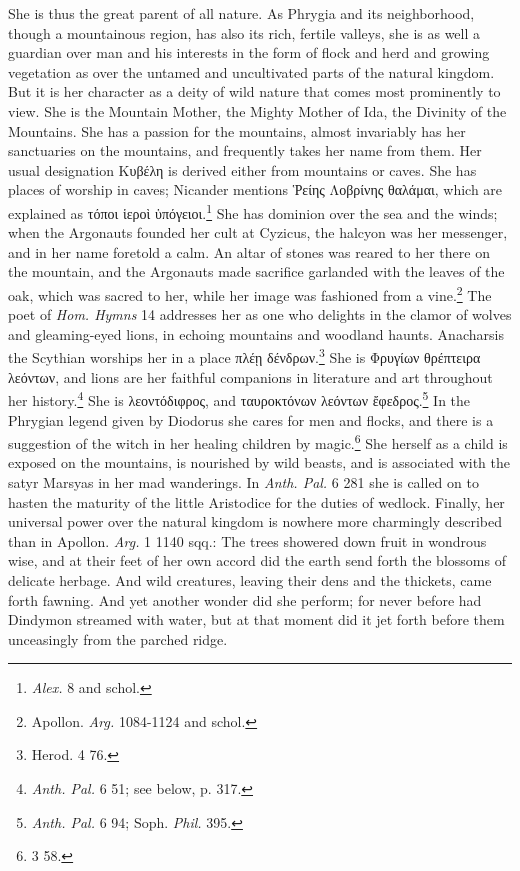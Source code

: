 \documentclass[a4paper, 11pt, oneside, polutonikogreek, english]{article}
\begin{document}
She is thus the great parent of all nature. As Phrygia and its neighborhood, though a mountainous region, has also its rich, fertile valleys, she is as well a guardian over man and his interests in the form of flock and herd and growing vegetation as over the untamed and uncultivated parts of the natural kingdom. But it is her character as a deity of wild nature that comes most prominently to view. She is the Mountain Mother, the Mighty Mother of Ida, the Divinity of the Mountains. She has a passion for the mountains, almost invariably has her sanctuaries on the mountains, and frequently takes her name from them. Her usual designation Κυβέλη is derived either from mountains or caves. She has places of worship in caves; Nicander mentions Ῥείης Λοβρίνης θαλάμαι, which are explained as τόποι ἱεροὶ ὑπόγειοι.\footnote{\emph{Alex.} 8 and schol.} She has dominion over the sea and the winds; when the Argonauts founded her cult at Cyzicus, the halcyon was her messenger, and in her name foretold a calm. An altar of stones was reared to her there on the mountain, and the Argonauts made sacrifice garlanded with the leaves of the oak, which was sacred to her, while her image was fashioned from a vine.\footnote{Apollon. \emph{Arg.} 1084-1124 and schol.} The poet of \emph{Hom. Hymns} 14 addresses her as one who delights in the clamor of wolves and gleaming-eyed lions, in echoing mountains and woodland haunts. Anacharsis the Scythian worships her in a place πλέῃ δένδρων.\footnote{Herod. 4 76.} She is Φρυγίων θρέπτειρα λεόντων, and lions are her faithful companions in literature and art throughout her history.\footnote{\emph{Anth. Pal.} 6 51; see below, p. 317.} She is λεοντόδιφρος, and ταυροκτόνων λεόντων ἔφεδρος.\footnote{\emph{Anth. Pal.} 6 94; Soph. \emph{Phil.} 395.} In the Phrygian legend given by Diodorus she cares for men and flocks, and there is a suggestion of the witch in her healing children by magic.\footnote{3 58.} She herself as a child is exposed on the mountains, is nourished by wild beasts, and is associated with the satyr Marsyas in her mad wanderings. In \emph{Anth. Pal.} 6 281 she is called on to hasten the maturity of the little Aristodice for the duties of wedlock. Finally, her universal power over the natural kingdom is nowhere more charmingly described than in Apollon. \emph{Arg.} 1 1140 sqq.: The trees showered down fruit in wondrous wise, and at their feet of her own accord did the earth send forth the blossoms of delicate herbage. And wild creatures, leaving their dens and the thickets, came forth fawning. And yet another wonder did she perform; for never before had Dindymon streamed with water, but at that moment did it jet forth before them unceasingly from the parched ridge.
\end{document}
